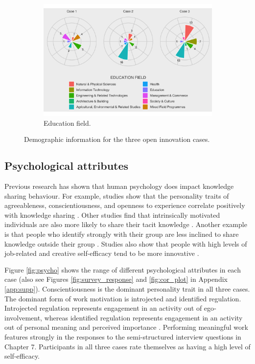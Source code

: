 \begin{figure}
\begin{subfigure}[b]{0.7\textwidth}
\includegraphics[width=1\linewidth]{Images/ed_field.png}
\caption{Education field.}
\end{subfigure}

\caption[Demographic information for each case]{Demographic information for the three open innovation cases.}
\label{fig:demographics}
\end{figure}


\subsection{Psychological attributes}

Previous research has shown that human psychology does impact knowledge sharing behaviour. For example, studies show that the personality traits of agreeableness, conscientiousness, and openness to experience correlate positively with knowledge sharing \citep{matzler2011personality,borges2012tacit}. Other studies find that intrinsically motivated individuals are also more likely to share their tacit knowledge \citep{hung2011influence,llopis2016understanding}. Another example is that people who identify strongly with their group are less inclined to share knowledge outside their group \citep{kane2005knowledge,argote2009superordinate,dokko2014one}. Studies also show that people with high levels of job-related and creative self-efficacy tend to be more innovative \citep{farmer2006developing, leonard2014knowledge}. \medskip

Figure \ref{fig:psycho} shows the range of different psychological attributes in each case (also see Figures \ref{fig:survey_response} and \ref{fig:cor_plot} in Appendix \ref{app:supp}). Conscientiousness is the dominant personality trait in all three cases. The dominant form of work motivation is introjected and identified regulation. Introjected regulation represents engagement in an activity out of ego‐involvement, whereas identified regulation represents engagement in an activity out of personal meaning and perceived importance \citep{gagne2019different}. Performing meaningful work features strongly in the responses to the semi-structured interview questions in Chapter 7. Participants in all three cases rate themselves as having a high level of self-efficacy. \medskip

